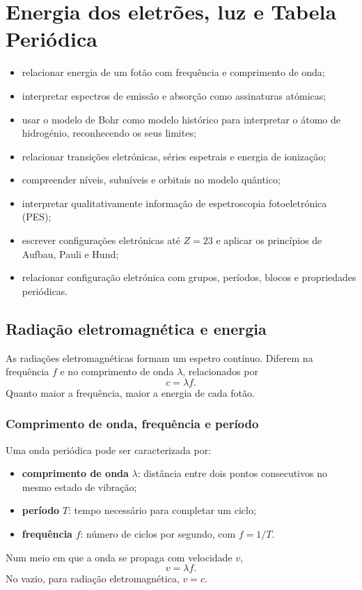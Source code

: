 \documentclass[11pt,a4paper,oneside]{book}
\begin{document}
\chapter{Energia dos eletrões, luz e Tabela Periódica}

\begin{objetivos}
\begin{itemize}
  \item relacionar energia de um fotão com frequência e comprimento de onda;
  \item interpretar espectros de emissão e absorção como assinaturas atómicas;
  \item usar o modelo de Bohr como modelo histórico para interpretar o átomo de hidrogénio, reconhecendo os seus limites;
  \item relacionar transições eletrónicas, séries espetrais e energia de ionização;
  \item compreender níveis, subníveis e orbitais no modelo quântico;
  \item interpretar qualitativamente informação de espetroscopia fotoeletrónica (PES);
  \item escrever configurações eletrónicas até $Z=23$ e aplicar os princípios de Aufbau, Pauli e Hund;
  \item relacionar configuração eletrónica com grupos, períodos, blocos e propriedades periódicas.
\end{itemize}
\end{objetivos}

\section{Radiação eletromagnética e energia}
As radiações eletromagnéticas formam um espetro contínuo. Diferem na frequência $f$ e no comprimento de onda $\lambda$, relacionados por
\[
c=\lambda f.
\]
Quanto maior a frequência, maior a energia de cada fotão.

\subsection*{Comprimento de onda, frequência e período}
Uma onda periódica pode ser caracterizada por:
\begin{itemize}
  \item \textbf{comprimento de onda} $\lambda$: distância entre dois pontos consecutivos no mesmo estado de vibração;
  \item \textbf{período} $T$: tempo necessário para completar um ciclo;
  \item \textbf{frequência} $f$: número de ciclos por segundo, com $f=1/T$.
\end{itemize}
Num meio em que a onda se propaga com velocidade $v$,
\[
v=\lambda f.
\]
No vazio, para radiação eletromagnética, $v=c$.
\end{document}
